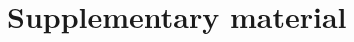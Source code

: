 \documentclass[a4paper,10pt,landscape]{article}
\begin{document}
\section*{Supplementary material}
\setcounter{table}{0}
\renewcommand{\thetable}{S\arabic{table}}

\clearpage

\clearpage

\clearpage

\clearpage

\clearpage

\end{document}

